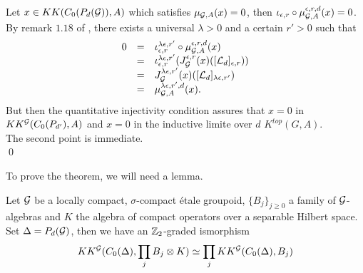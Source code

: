 \begin{dem}
Let $x\in KK(C_0(P_d(\mathcal G)),A)$ which satisfies $\mu_{\mathcal G,A}(x)=0$, then $\iota_{\epsilon,r}\circ\mu_{\mathcal G,A}^{\epsilon,r,d}(x)=0$. By remark $1.18$ of \cite{OY2}, there exists a universal $\lambda>0$ and a certain $r'>0$ such that
\[\begin{array}{lll}0 &  =  & \iota_{\epsilon,r}^{\lambda\epsilon,r'}\circ \mu_{\mathcal G,A}^{\epsilon,r,d}(x) \\
			& = & \iota_{\epsilon,r}^{\lambda\epsilon,r'} (J_{\mathcal G}^{\epsilon,r}(x)([\mathcal L_d]_{\epsilon,r})) \\
			& = & J_{\mathcal G}^{\lambda\epsilon,r'}(x)([\mathcal L_d]_{\lambda\epsilon,r'}) \\
			& = & \mu_{\mathcal G,A}^{\lambda\epsilon,r',d}(x).
\end{array}\]
But then the quantitative injectivity condition assures that $x=0$ in $KK^\mathcal G(C_0(P_{d'}),A)$ and $x=0$ in the inductive limite over $d$ $K^{top}(G,A)$.\\
The second point is immediate. \\
\qed
\end{dem}

To prove the theorem, we will need a lemma.\\

\begin{lem}
Let $\mathcal G$ be a locally compact, $\sigma$-compact étale groupoid, $\{B_j\}_{j\geq 0}$ a family of $\mathcal G$-algebras and $K$ the algebra of compact operators over a separable Hilbert space. Set $\Delta=P_d(\mathcal G)$, then we have an $\mathbb Z_2$-graded ismorphism 
\[KK^\mathcal G(C_0(\Delta),\prod_j B_j\otimes K)\simeq \prod_j KK^\mathcal G(C_0(\Delta),B_j)\]
\end{lem}

